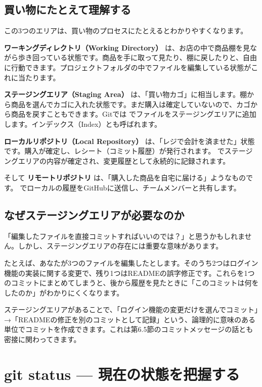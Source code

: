 \subsection{買い物にたとえて理解する}

この3つのエリアは、買い物のプロセスにたとえるとわかりやすくなります。

\textbf{ワーキングディレクトリ（Working Directory）} は、お店の中で商品棚を見ながら歩き回っている状態です。商品を手に取って見たり、棚に戻したりと、自由に行動できます。プロジェクトフォルダの中でファイルを編集している状態がこれに当たります。

\textbf{ステージングエリア（Staging Area）} は、「買い物カゴ」に相当します。棚から商品を選んでカゴに入れた状態です。まだ購入は確定していないので、カゴから商品を戻すこともできます。Gitでは  でファイルをステージングエリアに追加します。インデックス（Index）とも呼ばれます。

\textbf{ローカルリポジトリ（Local Repository）} は、「レジで会計を済ませた」状態です。購入が確定し、レシート（コミット履歴）が発行されます。 でステージングエリアの内容が確定され、変更履歴として永続的に記録されます。

そして \textbf{リモートリポジトリ} は、「購入した商品を自宅に届ける」ようなものです。 でローカルの履歴をGitHubに送信し、チームメンバーと共有します。

\subsection{なぜステージングエリアが必要なのか}

「編集したファイルを直接コミットすればいいのでは？」と思うかもしれません。しかし、ステージングエリアの存在には重要な意味があります。

たとえば、あなたが3つのファイルを編集したとします。そのうち2つはログイン機能の実装に関する変更で、残り1つはREADMEの誤字修正です。これらを1つのコミットにまとめてしまうと、後から履歴を見たときに「このコミットは何をしたのか」がわかりにくくなります。

ステージングエリアがあることで、「ログイン機能の変更だけを選んでコミット」→「READMEの修正を別のコミットとして記録」という、論理的に意味のある単位でコミットを作成できます。これは第6.5節のコミットメッセージの話とも密接に関わってきます。

\section{git status — 現在の状態を把握する}


